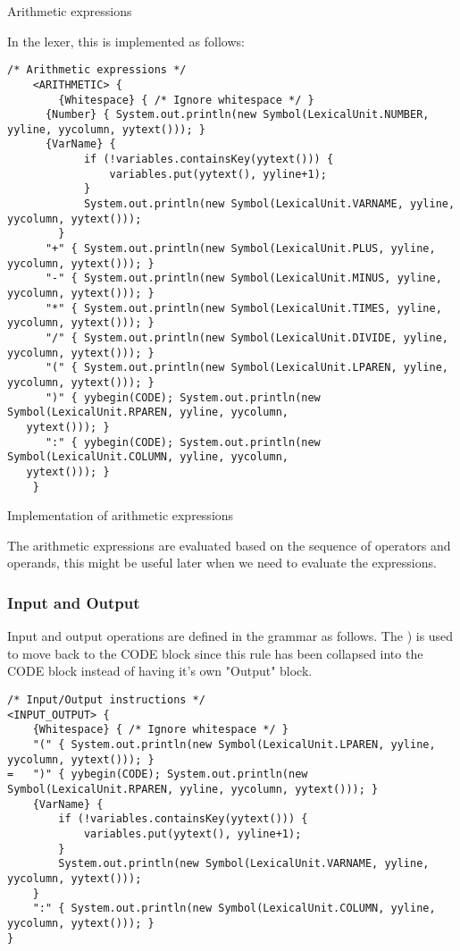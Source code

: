     \begin{table}[h]
		\centering
		\caption{Arithmetic expressions}
	\end{table}

	In the lexer, this is implemented as follows:

	\begin{verbatim}
/* Arithmetic expressions */
    <ARITHMETIC> {
        {Whitespace} { /* Ignore whitespace */ }
	  {Number} { System.out.println(new Symbol(LexicalUnit.NUMBER, yyline, yycolumn, yytext())); }
	  {VarName} {
            if (!variables.containsKey(yytext())) {
                variables.put(yytext(), yyline+1);
            }
            System.out.println(new Symbol(LexicalUnit.VARNAME, yyline, yycolumn, yytext()));
        }
	  "+" { System.out.println(new Symbol(LexicalUnit.PLUS, yyline, yycolumn, yytext())); }
	  "-" { System.out.println(new Symbol(LexicalUnit.MINUS, yyline, yycolumn, yytext())); }
	  "*" { System.out.println(new Symbol(LexicalUnit.TIMES, yyline, yycolumn, yytext())); }
	  "/" { System.out.println(new Symbol(LexicalUnit.DIVIDE, yyline, yycolumn, yytext())); }
	  "(" { System.out.println(new Symbol(LexicalUnit.LPAREN, yyline, yycolumn, yytext())); }
	  ")" { yybegin(CODE); System.out.println(new Symbol(LexicalUnit.RPAREN, yyline, yycolumn, 
   yytext())); }
	  ":" { yybegin(CODE); System.out.println(new Symbol(LexicalUnit.COLUMN, yyline, yycolumn, 
   yytext())); }
	}

	\end{verbatim}

    \begin{table}[h]
		\centering
		\caption{Implementation of arithmetic expressions}
	\end{table}

	The arithmetic expressions are evaluated based on the sequence of operators and operands, this might be useful later when we need to evaluate the expressions.\\

	\subsubsection{Input and Output}
	Input and output operations are defined in the grammar as follows.
	The ) is used to move back to the CODE block since this rule has been collapsed into the CODE block instead of having it's own "Output" block.\\
	\begin{verbatim}
/* Input/Output instructions */
<INPUT_OUTPUT> {
    {Whitespace} { /* Ignore whitespace */ }
    "(" { System.out.println(new Symbol(LexicalUnit.LPAREN, yyline, yycolumn, yytext())); }
=   ")" { yybegin(CODE); System.out.println(new Symbol(LexicalUnit.RPAREN, yyline, yycolumn, yytext())); }
    {VarName} {
        if (!variables.containsKey(yytext())) {
            variables.put(yytext(), yyline+1);
        }
        System.out.println(new Symbol(LexicalUnit.VARNAME, yyline, yycolumn, yytext()));
    }
    ":" { System.out.println(new Symbol(LexicalUnit.COLUMN, yyline, yycolumn, yytext())); }
}
\end{verbatim}

